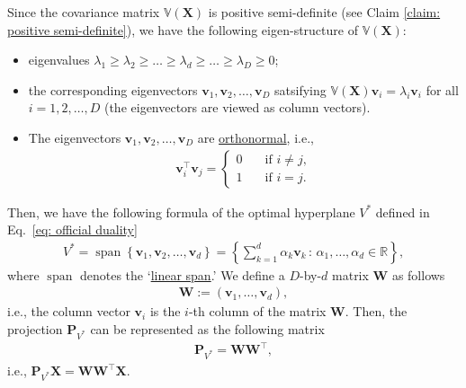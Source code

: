 \documentclass[11pt,letterpaper, leqno]{article}
\numberwithin{equation}{section}
\numberwithin{theorem}{section}
\numberwithin{lemma}{section}
\numberwithin{corollary}{section}
\numberwithin{definition}{section}
\numberwithin{proposition}{section}
\numberwithin{remark}{section}
\numberwithin{example}{section}
\newcommand{\T}{\intercal}
\begin{document}
Since the covariance matrix $\mathbb{V}(\boldsymbol{X})$ is positive semi-definite (see Claim \ref{claim: positive semi-definite}), we have the following eigen-structure of $\mathbb{V}(\boldsymbol{X})$:
\begin{itemize}
    \item eigenvalues $\lambda_1\ge\lambda_2\ge\ldots\ge\lambda_d\ge\ldots\ge\lambda_D\ge0$;
    \item the corresponding eigenvectors $\boldsymbol{v}_1, \boldsymbol{v}_2,\ldots, \boldsymbol{v}_D$ satsifying $\mathbb{V}(\boldsymbol{X})\boldsymbol{v}_i=\lambda_i \boldsymbol{v}_i$ for all $i=1,2,\ldots,D$ (the eigenvectors are viewed as column vectors).
    \item The eigenvectors $\boldsymbol{v}_1, \boldsymbol{v}_2,\ldots, \boldsymbol{v}_D$ are \href{https://en.wikipedia.org/wiki/Orthonormality}{orthonormal}, i.e.,
    \begin{align}\label{eq: Orthonormality}
        \boldsymbol{v}_i^\T \boldsymbol{v}_j=\left\{\begin{aligned}
            0\ \ \ &\text{ if }i\ne j,\\
        1\ \ \ &\text{ if }i=j.
        \end{aligned}\right.
    \end{align}
\end{itemize}
Then, we have the following formula of the optimal hyperplane $V^*$ defined in Eq.~\eqref{eq: official duality}
\begin{align*}
    \boxed{V^*=\operatorname{span}\left\{\boldsymbol{v}_1, \boldsymbol{v}_2,\ldots, \boldsymbol{v}_d\right\} = \left\{\sum_{k=1}^d \alpha_k \boldsymbol{v}_k \,:\, \alpha_1,\ldots, \alpha_d\in\mathbb{R}\right\},}
\end{align*}
where $\operatorname{span}$ denotes the `\href{https://en.wikipedia.org/wiki/Linear_span}{linear span}.' We define a $D$-by-$d$ matrix $\boldsymbol{W}$ as follows
\begin{align*}
    \boldsymbol{W}:=(\boldsymbol{v}_1,\ldots,\boldsymbol{v}_d),
\end{align*}
i.e., the column vector $\boldsymbol{v}_i$ is the $i$-th column of the matrix $\boldsymbol{W}$. Then, the projection $\boldsymbol{P}_{V^*}$ can be represented as the following matrix
\begin{align}\label{eq: optimal projection}
    \boxed{\boldsymbol{P}_{V^*}=\boldsymbol{W}\boldsymbol{W}^\T,}
\end{align}
i.e., $\boldsymbol{P}_{V^*}\boldsymbol{X}=\boldsymbol{W}\boldsymbol{W}^\T\boldsymbol{X}$.
\end{document}
